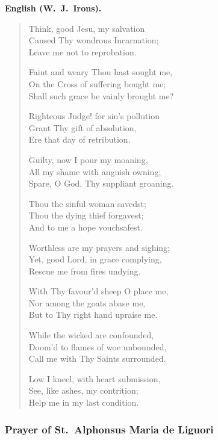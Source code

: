 \textbf{English (W.\ J.\ Irons).}

\begin{quote}
Think, good Jesu, my salvation\\
Caused Thy wondrous Incarnation;\\
Leave me not to reprobation.

Faint and weary Thou hast sought me,\\
On the Cross of suffering bought me;\\
Shall such grace be vainly brought me?

Righteous Judge! for sin's pollution\\
Grant Thy gift of absolution,\\
Ere that day of retribution.

Guilty, now I pour my moaning,\\
All my shame with anguish owning;\\
Spare, O God, Thy suppliant groaning.

Thou the sinful woman savedst;\\
Thou the dying thief forgavest;\\
And to me a hope vouchsafest.

Worthless are my prayers and sighing;\\
Yet, good Lord, in grace complying,\\
Rescue me from fires undying.

With Thy favour'd sheep O place me,\\
Nor among the goats abase me,\\
But to Thy right hand upraise me.

While the wicked are confounded,\\
Doom'd to flames of woe unbounded,\\
Call me with Thy Saints surrounded.

Low I kneel, with heart submission,\\
See, like ashes, my contrition;\\
Help me in my last condition.
\end{quote}

\subsubsection*{Prayer of St.\ Alphonsus Maria de Liguori}

